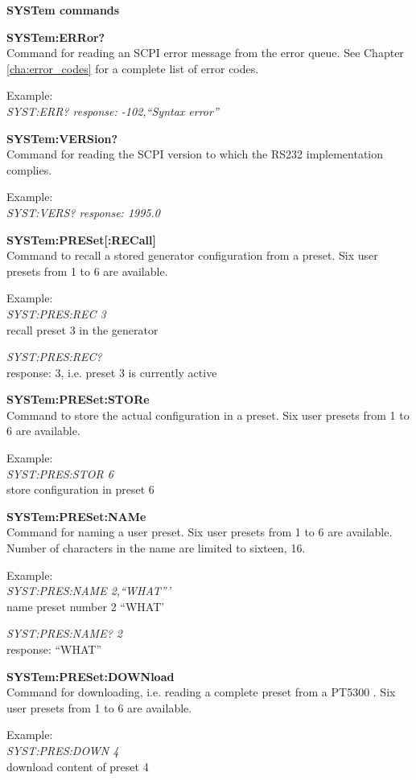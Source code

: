 \textbf{SYSTem commands}

\textbf{SYSTem:ERRor?}\\
Command for reading an SCPI error message from the error queue. See Chapter \ref{cha:error_codes} for a complete list of error codes.

Example:\\
\textit{SYST:ERR? response: -102,``Syntax error''}

\textbf{SYSTem:VERSion?}\\
Command for reading the SCPI version to which the RS232 implementation complies.

Example:\\
\textit{SYST:VERS? response: 1995.0}

\textbf{SYSTem:PRESet[:RECall]}\\
Command to recall a stored generator configuration from a preset. Six user presets from 1 to 6 are available.

Example:\\
\textit{SYST:PRES:REC 3}\\
recall preset 3 in the generator

\textit{SYST:PRES:REC?}\\
response: 3, i.e. preset 3 is currently active

\textbf{SYSTem:PRESet:STORe}\\
Command to store the actual configuration in a preset. Six user presets from 1 to 6 are available.

Example:\\
\textit{SYST:PRES:STOR 6}\\
store configuration in preset 6

\textbf{SYSTem:PRESet:NAMe}\\
Command for naming a user preset. Six user presets from 1 to 6 are available. Number of characters in the name are limited to sixteen, 16.

Example:\\
\textit{SYST:PRES:NAME 2,``WHAT'''}\\
name preset number 2 ``WHAT'

\textit{SYST:PRES:NAME? 2}\\
response: ``WHAT''

\textbf{SYSTem:PRESet:DOWNload}\\
Command for downloading, i.e. reading a complete preset from a PT5300 . Six user presets from 1 to 6 are available.\NoTelnetSupport

Example:\\
\textit{SYST:PRES:DOWN 4}\\
download content of preset 4

